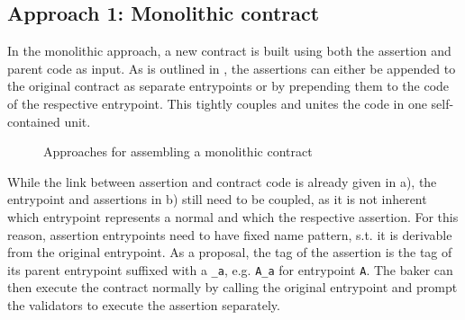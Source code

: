 \subsection{Approach 1: Monolithic contract}
In the monolithic approach, a new contract is built using both the assertion and parent code as input. As is outlined in , the assertions can either be appended to the original contract as separate entrypoints or by prepending them to the code of the respective entrypoint. This tightly couples and unites the code in one self-contained unit.
\begin{figure}[!htb]
\quad
{}
\caption{Approaches for assembling a monolithic contract}
\label{fig:monolithic_orchestration_basic}
\end{figure}
While the link between assertion and contract code is already given in a), the entrypoint and assertions in b) still need to be coupled, as it is not inherent which entrypoint represents a normal and which the respective assertion. For this reason, assertion entrypoints need to have fixed name pattern, s.t. it is derivable from the original entrypoint. As a proposal, the tag of the assertion is the tag of its parent entrypoint suffixed with a \texttt{\_a}, e.g. \texttt{A\_a} for entrypoint \texttt{A}. The baker can then execute the contract normally by calling the original entrypoint and prompt the validators to execute the assertion separately. \\
